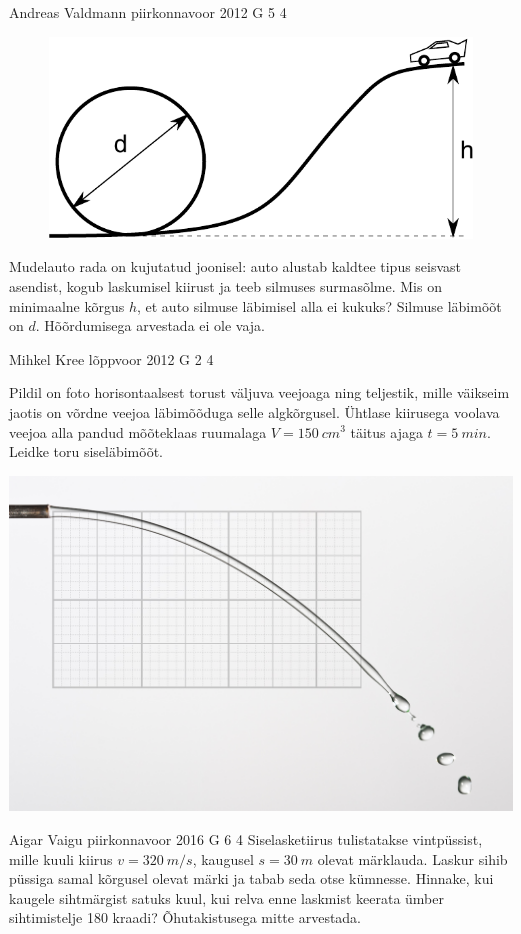 \documentclass[11pt]{article}
\begin{document}
{%
{Andreas Valdmann} %
{piirkonnavoor} %
{2012} %
{G 5} %
{4} %
{
\ifStatement
\begin{figure}%
\includegraphics[width=\linewidth]{2012-v2g-05-silmus}%
\end{figure}
Mudelauto rada on kujutatud joonisel: auto alustab kaldtee tipus seisvast
asendist, kogub laskumisel kiirust ja teeb silmuses surmasõlme. Mis on
minimaalne kõrgus $h$, et auto silmuse läbimisel alla ei kukuks? Silmuse
läbimõõt on $d$. Hõõrdumisega arvestada ei ole vaja.
\fi
}

{Mihkel Kree} %
{lõppvoor} %
{2012} %
{G 2} %
{4} %
{
\ifStatement
Pildil on foto horisontaalsest torust väljuva veejoaga ning teljestik, mille
väikseim jaotis on võrdne veejoa läbimõõduga selle algkõrgusel. Ühtlase
kiirusega voolava veejoa alla pandud mõõteklaas ruumalaga
$V=\SI{150}{cm^3}$ täitus ajaga $t=\SI{5}{min}$. Leidke
toru siseläbimõõt.
\begin{center}
\includegraphics[width=0.7\linewidth]{2012-v3g-02-jet}%
\end{center}
\fi
}

{Aigar Vaigu} %
{piirkonnavoor} %
{2016} %
{G 6} %
{4} %
{
\ifStatement
Siselasketiirus tulistatakse vintpüssist, mille kuuli kiirus $v=\SI{320}{m/s}$, kaugusel $s=\SI{30}{m}$ olevat märklauda. Laskur sihib püssiga samal kõrgusel olevat märki ja tabab seda otse kümnesse. Hinnake, kui kaugele sihtmärgist satuks kuul, kui relva enne laskmist keerata ümber sihtimistelje 180 kraadi? Õhutakistusega mitte arvestada.
\fi
}

}
\end{document}
